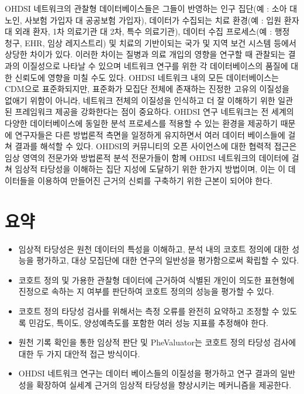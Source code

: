 \documentclass[11pt]{book}
\providecommand{\tightlist}{%
  \setlength{\itemsep}{0pt}\setlength{\parskip}{0pt}}
\theoremstyle{definition}
\theoremstyle{definition}
\theoremstyle{definition}
\theoremstyle{remark}
\let\BeginKnitrBlock\begin \let\EndKnitrBlock\end
\begin{document}
OHDSI 네트워크의 관찰형 데이터베이스들은 그들이 반영하는 인구 집단(예 :
소아 대 노인, 사보험 가입자 대 공공보험 가입자), 데이터가 수집되는 치료
환경(예 : 입원 환자 대 외래 환자, 1차 의료기관 대 2차, 특수 의료기관),
데이터 수집 프로세스(예 : 행정 청구, EHR, 임상 레지스트리) 및 치료의
기반이되는 국가 및 지역 보건 시스템 등에서 상당한 차이가 있다. 이러한
차이는 질병과 의료 개입의 영향을 연구할 때 관찰되는 결과의 이질성으로
나타날 수 있으며 네트워크 연구를 위한 각 데이터베이스의 품질에 대한
신뢰도에 영향을 미칠 수도 있다. OHDSI 네트워크 내의 모든 데이터베이스는
CDM으로 표준화되지만, 표준화가 모집단 전체에 존재하는 진정한 고유의
이질성을 없애기 위함이 아니라, 네트워크 전체의 이질성을 인식하고 더 잘
이해하기 위한 일관된 프레임워크 제공을 강화한다는 점이 중요하다. OHDSI
연구 네트워크는 전 세계의 다양한 데이터베이스에 동일한 분석 프로세스를
적용할 수 있는 환경을 제공하기 때문에 연구자들은 다른 방법론적 측면을
일정하게 유지하면서 여러 데이터 베이스들에 걸쳐 결과를 해석할 수 있다.
OHDSI의 커뮤니티의 오픈 사이언스에 대한 협력적 접근은 임상 영역의
전문가와 방법론적 분석 전문가들이 함께 OHDSI 네트워크의 데이터에 걸쳐
임상적 타당성을 이해하는 집단 지성에 도달하기 위한 한가지 방법이며, 이는
이 데이터들을 이용하여 만들어진 근거의 신뢰를 구축하기 위한 근본이
되어야 한다.

\section{요약}\label{-14}

\BeginKnitrBlock{rmdsummary}
\begin{itemize}
\tightlist
\item
  임상적 타당성은 원천 데이터의 특성을 이해하고, 분석 내의 코호트 정의에
  대한 성능을 평가하고, 대상 모집단에 대한 연구의 일반성을 평가함으로써
  확립할 수 있다.
\item
  코호트 정의 및 가용한 관찰형 데이터에 근거하여 식별된 개인이 의도한
  표현형에 진정으로 속하는 지 여부를 판단하여 코호트 정의의 성능을
  평가할 수 있다.
\item
  코호트 정의 타당성 검사를 위해서는 측정 오류를 완전히 요약하고 조정할
  수 있도록 민감도, 특이도, 양성예측도를 포함한 여러 성능 지표를
  추정해야 한다.
\item
  원천 기록 확인을 통한 임상적 판단 및 PheValuator는 코호트 정의 타당성
  검사에 대한 두 가지 대안적 접근 방식이다.
\item
  OHDSI 네트워크 연구는 데이터 베이스들의 이질성을 평가하고 연구 결과의
  일반성을 확장하여 실세계 근거의 임상적 타당성을 향상시키는 메커니즘을
  제공한다.
\end{itemize}
\EndKnitrBlock{rmdsummary}
\end{document}
